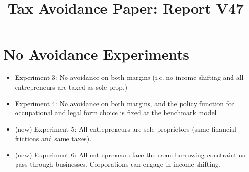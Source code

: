 \documentclass[11pt,english]{article}
\begin{document}
\title{Tax Avoidance Paper: Report V47}
\maketitle

\section{No Avoidance Experiments \label{sec:exp}}

\begin{itemize}
	\item Experiment 3: No avoidance on both margins (i.e. no income shifting and all entrepreneurs are taxed as sole-prop.)
	\item Experiment 4: No avoidance on both margins, and the policy function for occupational and legal form choice is fixed at the benchmark model.
	\item (new) Experiment 5: All entrepreneurs are sole proprietors (same financial frictions and same taxes).
	\item (new) Experiment 6: All entrepreneurs face the same borrowing constraint as pass-through businesses. Corporations can engage in income-shifting.
\end{itemize}
\end{document}
